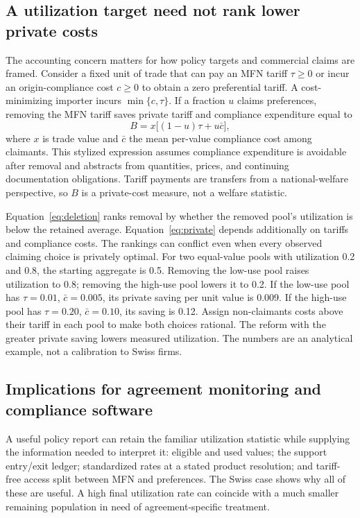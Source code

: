 \documentclass[11pt,a4paper]{article}
\begin{document}
\subsection{A utilization target need not rank lower private costs}
The accounting concern matters for how policy targets and commercial claims are framed. Consider a fixed unit of trade that can pay an MFN tariff $\tau\geq0$ or incur an origin-compliance cost $c\geq0$ to obtain a zero preferential tariff. A cost-minimizing importer incurs $\min\{c,\tau\}$. If a fraction $u$ claims preferences, removing the MFN tariff saves private tariff and compliance expenditure equal to
\begin{equation}
 B=x\big[(1-u)\tau+u\bar c\big],
 \label{eq:private}
\end{equation}
where $x$ is trade value and $\bar c$ the mean per-value compliance cost among claimants. This stylized expression assumes compliance expenditure is avoidable after removal and abstracts from quantities, prices, and continuing documentation obligations. Tariff payments are transfers from a national-welfare perspective, so $B$ is a private-cost measure, not a welfare statistic.

Equation~\eqref{eq:deletion} ranks removal by whether the removed pool's utilization is below the retained average. Equation~\eqref{eq:private} depends additionally on tariffs and compliance costs. The rankings can conflict even when every observed claiming choice is privately optimal. For two equal-value pools with utilization 0.2 and 0.8, the starting aggregate is 0.5. Removing the low-use pool raises utilization to 0.8; removing the high-use pool lowers it to 0.2. If the low-use pool has $\tau=0.01$, $\bar c=0.005$, its private saving per unit value is 0.009. If the high-use pool has $\tau=0.20$, $\bar c=0.10$, its saving is 0.12. Assign non-claimants costs above their tariff in each pool to make both choices rational. The reform with the greater private saving lowers measured utilization. The numbers are an analytical example, not a calibration to Swiss firms.

\subsection{Implications for agreement monitoring and compliance software}
A useful policy report can retain the familiar utilization statistic while supplying the information needed to interpret it: eligible and used values; the support entry/exit ledger; standardized rates at a stated product resolution; and tariff-free access split between MFN and preferences. The Swiss case shows why all of these are useful. A high final utilization rate can coincide with a much smaller remaining population in need of agreement-specific treatment.
\end{document}
